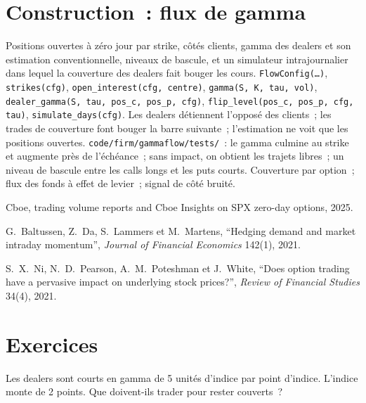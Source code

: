 \section{Construction~: flux de gamma}\label{bld:s2:zero-day-options-and-dealer-gamma-flows:gammaflow}

\begin{build}
 Positions ouvertes à zéro jour par strike, côtés clients, gamma des dealers et son estimation conventionnelle, niveaux de bascule, et un
simulateur intrajournalier dans lequel la couverture des dealers fait bouger les cours.
 \texttt{FlowConfig(\dots)}, \texttt{strikes(cfg)}, \texttt{open\_interest(cfg, centre)}, \texttt{gamma(S, K, tau, vol)},
\texttt{dealer\_gamma(S, tau, pos\_c, pos\_p, cfg)}, \texttt{flip\_level(pos\_c, pos\_p, cfg, tau)}, \texttt{simulate\_days(cfg)}.
 Les dealers détiennent l'opposé des clients~; les trades de couverture font bouger la barre suivante~; l'estimation ne voit que les positions ouvertes.
 \texttt{code/firm/gammaflow/tests/}~: le gamma culmine au strike et augmente près de l'échéance~; sans impact, on obtient les trajets libres~; un niveau de bascule
entre les calls longs et les puts courts.
 Couverture par option~; flux des fonds à effet de levier~; signal de côté bruité.
\end{build}

\begin{omsources}
\item Cboe, trading volume reports and Cboe Insights on SPX zero-day options, 2025.
\item G.~Baltussen, Z.~Da, S.~Lammers et M.~Martens, ``Hedging demand and market intraday momentum'', \emph{Journal of Financial Economics}
142(1), 2021.
\item S.~X.~Ni, N.~D.~Pearson, A.~M.~Poteshman et J.~White, ``Does option trading have a pervasive impact on underlying stock prices?'',
\emph{Review of Financial Studies} 34(4), 2021.
\end{omsources}

\section{Exercices}

\begin{exercise}[$\star$]\label{exo:s2:zero-day-options-and-dealer-gamma-flows:1}
Les dealers sont courts en gamma de 5 unités d'indice par point d'indice. L'indice monte de 2 points. Que doivent-ils trader pour rester couverts~?
\end{exercise}

